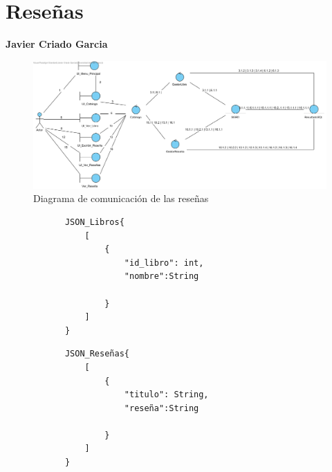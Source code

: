﻿\documentclass{report}
\begin{document}
        \section{Reseñas}
        \textbf{Javier Criado Garcia}
        \begin{figure}[H]
            \centering
            \includegraphics[width=1.0\textwidth]{img/comunicacion/resenas.png}
            \caption{Diagrama de comunicación de las reseñas}
        \end{figure}
        \begin{verbatim}
            JSON_Libros{
                [
                    {
                        "id_libro": int,
                        "nombre":String

                    }
                ]
            }
        \end{verbatim}
        \begin{verbatim}
            JSON_Reseñas{
                [
                    {
                        "titulo": String,
                        "reseña":String

                    }
                ]
            }
        \end{verbatim}
\end{document}
